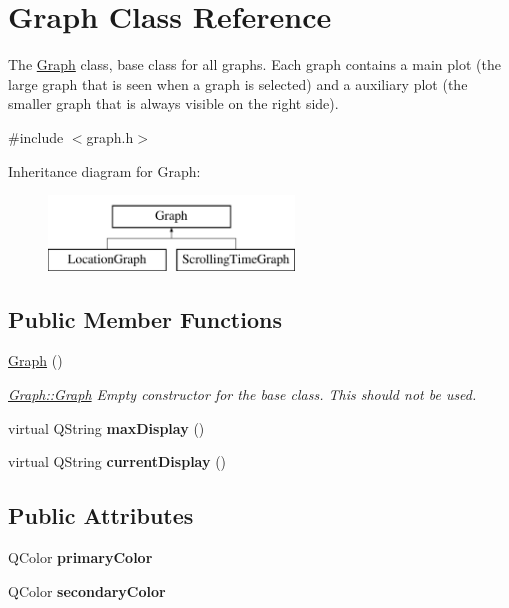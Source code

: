 \hypertarget{class_graph}{}\section{Graph Class Reference}
\label{class_graph}


The \hyperlink{class_graph}{Graph} class, base class for all graphs. Each graph contains a main plot (the large graph that is seen when a graph is selected) and a auxiliary plot (the smaller graph that is always visible on the right side).  




{\ttfamily \#include $<$graph.\+h$>$}

Inheritance diagram for Graph\+:\begin{figure}[H]
\begin{center}
\leavevmode
\includegraphics[height=2.000000cm]{class_graph}
\end{center}
\end{figure}
\subsection*{Public Member Functions}
\begin{DoxyCompactItemize}
\item 
\hypertarget{class_graph_ae4c72b8ac4d693c49800a4c7e273654f}{}\label{class_graph_ae4c72b8ac4d693c49800a4c7e273654f} 
\hyperlink{class_graph_ae4c72b8ac4d693c49800a4c7e273654f}{Graph} ()
\begin{DoxyCompactList}\small\item\em \hyperlink{class_graph_ae4c72b8ac4d693c49800a4c7e273654f}{Graph\+::\+Graph} Empty constructor for the base class. This should not be used. \end{DoxyCompactList}\item 
\hypertarget{class_graph_a5102e5e984c2ddebb79b9771b9d37f9f}{}\label{class_graph_a5102e5e984c2ddebb79b9771b9d37f9f} 
virtual Q\+String {\bfseries max\+Display} ()
\item 
\hypertarget{class_graph_a85028910472bc7815ad024ca025bb142}{}\label{class_graph_a85028910472bc7815ad024ca025bb142} 
virtual Q\+String {\bfseries current\+Display} ()
\end{DoxyCompactItemize}
\subsection*{Public Attributes}
\begin{DoxyCompactItemize}
\item 
\hypertarget{class_graph_ab42ef887ac4d6bad01cc0c2c3609ab6b}{}\label{class_graph_ab42ef887ac4d6bad01cc0c2c3609ab6b} 
Q\+Color {\bfseries primary\+Color}
\item 
\hypertarget{class_graph_a7bda51c2c124dfe46d5ee515a2508511}{}\label{class_graph_a7bda51c2c124dfe46d5ee515a2508511} 
Q\+Color {\bfseries secondary\+Color}
\end{DoxyCompactItemize}
